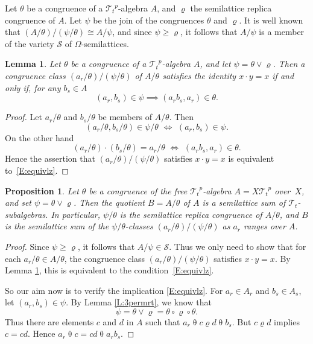\documentclass{birkau}
\def\Om{\Omega}
\newcommand{\mcT}{\mathcal{T}}
\newcommand{\mcS}{\mathcal{S}}
\newcommand{\pro}[1]{{#1}^p}
\theoremstyle{plain}
\newtheorem{proposition}[theorem]{Proposition}
\newtheorem{lemma}[theorem]{Lemma}
\theoremstyle{definition}
\numberwithin{equation}{section}
\begin{document}
Let $\theta$ be a congruence of a $\pro{\mcT_t}$-algebra $A$, and $\varrho$ the
semilattice replica congruence of $A$. Let $\psi$ be the join of the congruences $\theta$
and $\varrho$.  It is well known that $(A/\theta)/(\psi/\theta) \cong A/\psi$, and since
$\psi \geq \varrho$, it follows that $A/\psi$ is a member of the variety $\mcS$ of
$\Om$-semilattices.

\begin{lemma}\label{L:equivlz}
Let $\theta$ be a congruence of a $\pro{\mcT_t}$-algebra $A$, and let $\psi = \theta \vee
\varrho$. Then a congruence class $(a_r/\theta)/(\psi/\theta)$  of $A/\theta$ satisfies
the identity $x \cdot y = x$ if and only if, for any $b_s \in A$
\begin{equation}\label{E:equivlz}
(a_r, b_s) \in \psi \implies (a_r b_s, a_r) \in \theta.
\end{equation}
\end{lemma}
\begin{proof}
Let $a_r/\theta$ and $b_s/\theta$ be members of $A/\theta$. Then
\begin{equation*}
 (a_r/\theta, b_s/\theta) \in \psi/\theta \,\, \iff \,\, (a_r,b_s) \in \psi.
\end{equation*}
On the other hand
\begin{equation*}
(a_r/\theta) \cdot (b_s/\theta) = a_r/\theta \,\, \iff \,\, (a_r b_s, a_r) \in \theta.
\end{equation*}
Hence the assertion that $(a_r/\theta)/(\psi/\theta)$ satisfies $x \cdot y = x$ is equivalent to~\eqref{E:equivlz}.
\end{proof}

\begin{proposition}\label{P:quotient}
  Let $\theta$ be a congruence of the free $\pro{\mcT_t}$-algebra $A = X\pro{\mcT_t}$
  over~$X$, and set $\psi=\theta \vee \varrho$. Then the quotient $B = A/\theta$ of $A$ is
  a semilattice sum of $\mcT_t$-subalgebras. In particular, $\psi/\theta$ is the
  semilattice replica congruence of $A/\theta$, and $B$ is the semilattice sum of the
  $\psi/\theta$-classes $(a_r/\theta)/(\psi/\theta)$ as $a_r$ ranges over $A$.
\end{proposition}

\begin{proof}
Since $\psi \geq \varrho$, it follows that $A/\psi \in \mcS$. Thus we only need to show
that for each $a_r/\theta \in A/\theta$, the congruence class $(a_r/\theta)/(\psi/\theta)$
satisfies $x \cdot y = x$. By Lemma \ref{L:equivlz}, this is equivalent to the
condition~\eqref{E:equivlz}.

So our aim now is to verify the implication \eqref{E:equivlz}. For $a_r \in A_r$ and
$b_s \in A_s$, let $(a_r, b_s) \in \psi$.  By Lemma \ref{L:3permrt}, we know that
\begin{equation*}
\psi = \theta \vee \varrho =\theta \circ \varrho \circ\theta.
\end{equation*}
Thus there are elements $c$ and $d$ in $A$ such that $a_r \mathrel{\theta} c
\mathrel{\varrho} d \mathrel{\theta} b_s$. But $c \mathrel{\varrho} d$ implies $c=cd$. Hence
$a_r \mathrel{\theta} c = cd
\mathrel{\theta} a_rb_s$.
\end{proof}
\end{document}
